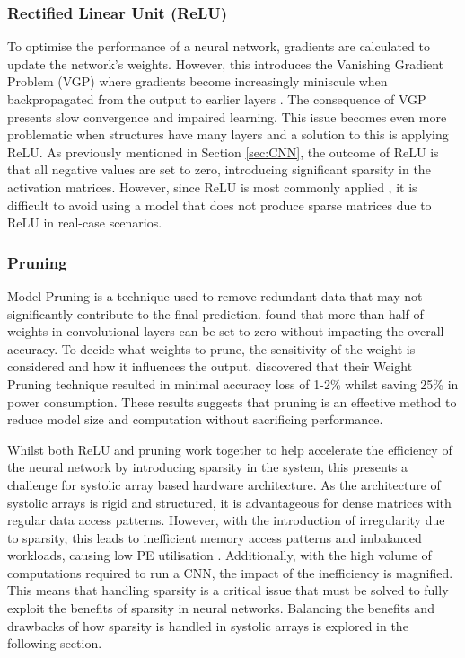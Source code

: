 \documentclass[12pt, a4paper, ukenglish]{article}
\begin{document}
        \subsubsection{Rectified Linear Unit (ReLU)} \label{sec:relu}
        To optimise the performance of a neural network, gradients are calculated to update the network's weights. However, this introduces the Vanishing Gradient Problem (VGP) where gradients become increasingly miniscule when backpropagated from the output to earlier layers \cite{tan_vanishing_2019}. The consequence of VGP presents slow convergence and impaired learning. This issue becomes even more problematic when structures have many layers and a solution to this is applying ReLU. As previously mentioned in Section \ref{sec:CNN}, the outcome of ReLU is that all negative values are set to zero, introducing significant sparsity in the activation matrices. However, since ReLU is most commonly applied \cite{sun_sense_2023}, it is difficult to avoid using a model that does not produce sparse matrices due to ReLU in real-case scenarios.


    
        \subsubsection{Pruning}\label{sec:pruning}

    Model Pruning is a technique used to remove redundant data that may not significantly contribute to the final prediction. \textcite{kim_fpga_2021} found that more than half of weights in convolutional layers can be set to zero without impacting the overall accuracy. To decide what weights to prune, the sensitivity of the weight is considered and how it influences the output. \textcite{gorvadiya_energy_2025} discovered that their Weight Pruning technique resulted in minimal accuracy loss of 1-2\% whilst saving 25\% in power consumption. These results suggests that pruning is an effective method to reduce model size and computation without sacrificing performance.

    Whilst both ReLU and pruning work together to help accelerate the efficiency of the neural network by introducing sparsity in the system, this presents a challenge for systolic array based hardware architecture.
    As the architecture of systolic arrays is rigid and structured, it is advantageous for dense matrices with regular data access patterns. However, with the introduction of irregularity due to sparsity, this leads to inefficient memory access patterns and imbalanced workloads, causing low PE utilisation \cite{he_sparse-tpu_2020}. Additionally, with the high volume of computations required to run a CNN, the impact of the inefficiency is magnified. This means that handling sparsity is a critical issue that must be solved to fully exploit the benefits of sparsity in neural networks. Balancing the benefits and drawbacks of how sparsity is handled in systolic arrays is explored in the following section.
\end{document}
